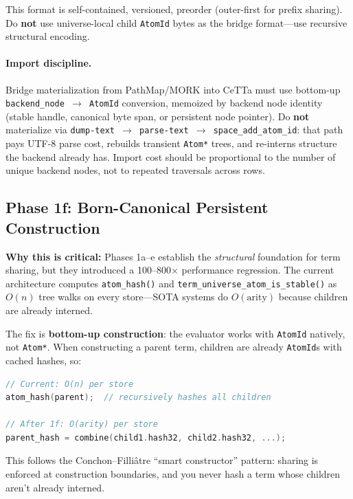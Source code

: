 \documentclass[11pt]{article}
\newcommand{\code}[1]{\texttt{#1}}
\newcommand{\CeTTa}{\textup{CeTTa}}
\newcommand{\PathMap}{\textup{PathMap}}
\newcommand{\MORK}{\textup{MORK}}
\begin{document}
This format is self-contained, versioned, preorder (outer-first for prefix
sharing).  Do \textbf{not} use universe-local child \code{AtomId} bytes as
the bridge format---use recursive structural encoding.

\paragraph{Import discipline.}
Bridge materialization from \PathMap{}/\MORK{} into \CeTTa{} must use
bottom-up \code{backend\_node $\rightarrow$ AtomId} conversion, memoized by
backend node identity (stable handle, canonical byte span, or persistent
node pointer).  Do \textbf{not} materialize via
\code{dump-text $\rightarrow$ parse-text $\rightarrow$ space\_add\_atom\_id}:
that path pays UTF-8 parse cost, rebuilds transient \code{Atom*} trees, and
re-interns structure the backend already has.  Import cost should be
proportional to the number of unique backend nodes, not to repeated
traversals across rows.

\subsection{Phase 1f: Born-Canonical Persistent Construction}

\textbf{Why this is critical:} Phases 1a--e establish the \emph{structural}
foundation for term sharing, but they introduced a 100--800$\times$ performance
regression. The current architecture computes \code{atom\_hash()} and
\code{term\_universe\_atom\_is\_stable()} as $O(n)$ tree walks on every
store---SOTA systems do $O(\mathrm{arity})$ because children are already interned.

The fix is \textbf{bottom-up construction}: the evaluator works with
\code{AtomId} natively, not \code{Atom*}. When constructing a parent term,
children are already \code{AtomId}s with cached hashes, so:

\begin{lstlisting}[language=C]
// Current: O(n) per store
atom_hash(parent);  // recursively hashes all children

// After 1f: O(arity) per store
parent_hash = combine(child1.hash32, child2.hash32, ...);
\end{lstlisting}

This follows the Conchon--Filli\^{a}tre ``smart constructor'' pattern: sharing
is enforced at construction boundaries, and you never hash a term whose
children aren't already interned.
\end{document}
